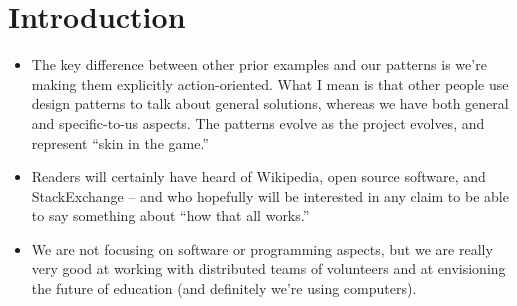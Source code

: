 \section{Introduction}

\begin{itemize}
\item The key difference between other prior examples and our
patterns is we're making them explicitly action-oriented.  What I mean
is that other people use design patterns to talk about general
solutions, whereas we have both general and specific-to-us aspects.
The patterns evolve as the project evolves, and represent ``skin in the game.''
\item Readers will certainly have heard of Wikipedia, open source
software, and StackExchange -- and who hopefully will be interested in
any claim to be able to say something about ``how that all works.''
\item We are not focusing on software or programming aspects, but we
are really very good at working with distributed teams of volunteers and
at envisioning the future of education (and definitely we're using
computers).
\end{itemize}